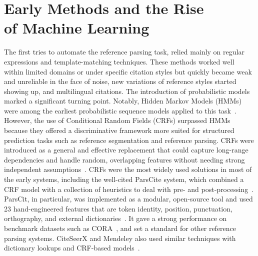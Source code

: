 \section[Early Methods and the Rise of Machine Learning]{Early Methods and the Rise\\ of Machine Learning}
The first tries to automate the reference parsing task, relied mainly on regular expressions and template-matching techniques. These methods worked well within limited domains or under specific citation styles but quickly became weak and unreliable in the face of noise, new variations of reference styles started showing up, and multilingual citations. The introduction of probabilistic models marked a significant turning point. Notably, Hidden Markov Models (HMMs) were among the earliest probabilistic sequence models applied to this task~\cite{HMM1165342}.
However, the use of Conditional Random Fields (CRFs) surpassed HMMs because they offered a discriminative framework more suited for structured prediction tasks such as reference segmentation and reference parsing. CRFs were introduced as a general and effective replacement that could capture long-range dependencies and handle random, overlapping features without needing strong independent assumptions~\cite{crf2001}. CRFs were the most widely used solutions in most of the early systems, including the well-cited ParsCite system, which combined a CRF model with a collection of heuristics to deal with pre- and post-processing~\cite{councill-etal-2008-parscit}.
ParsCit, in particular, was implemented as a modular, open-source tool and used 23 hand-engineered features that are token identity, position, punctuation, orthography, and external dictionaries~\cite{councill-etal-2008-parscit}. It gave a strong performance on benchmark datasets such as CORA~\cite{cora1999}, and set a standard for other reference parsing systems. CiteSeerX and Mendeley also used similar techniques with dictionary lookups and CRF-based models~\cite{councill-etal-2008-parscit,citeseerx}.

